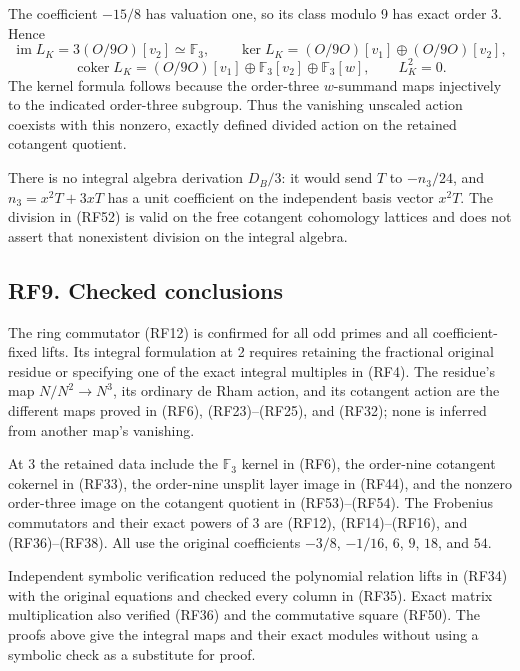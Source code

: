 \documentclass[
]{article}
\begin{document}
The coefficient \(-15/8\) has valuation one, so its class modulo 9 has
exact order 3. Hence \[
\operatorname{im}L_K=3(O/9O)[v_2]\simeq\mathbb F_3,\qquad
\ker L_K=(O/9O)[v_1]\oplus(O/9O)[v_2],
\] \[
\operatorname{coker}L_K
=(O/9O)[v_1]\oplus\mathbb F_3[v_2]\oplus\mathbb F_3[w],
\qquad L_K^2=0.
\tag{RF54}
\] The kernel formula follows because the order-three \(w\)-summand maps
injectively to the indicated order-three subgroup. Thus the vanishing
unscaled action coexists with this nonzero, exactly defined divided
action on the retained cotangent quotient.

There is no integral algebra derivation \(D_B/3\): it would send \(T\)
to \(-n_3/24\), and \(n_3=x^2T+3xT\) has a unit coefficient on the
independent basis vector \(x^2T\). The division in (RF52) is valid on
the free cotangent cohomology lattices and does not assert that
nonexistent division on the integral algebra.

\subsection{RF9. Checked conclusions}\label{rf9.-checked-conclusions}

The ring commutator (RF12) is confirmed for all odd primes and all
coefficient-fixed lifts. Its integral formulation at 2 requires
retaining the fractional original residue or specifying one of the exact
integral multiples in (RF4). The residue's map \(N/N^2\to N^3\), its
ordinary de Rham action, and its cotangent action are the different maps
proved in (RF6), (RF23)--(RF25), and (RF32); none is inferred from
another map's vanishing.

At 3 the retained data include the \(\mathbb F_3\) kernel in (RF6), the
order-nine cotangent cokernel in (RF33), the order-nine unsplit layer
image in (RF44), and the nonzero order-three image on the cotangent
quotient in (RF53)--(RF54). The Frobenius commutators and their exact
powers of 3 are (RF12), (RF14)--(RF16), and (RF36)--(RF38). All use the
original coefficients \(-3/8\), \(-1/16\), \(6\), \(9\), \(18\), and
\(54\).

Independent symbolic verification reduced the polynomial relation lifts
in (RF34) with the original equations and checked every column in
(RF35). Exact matrix multiplication also verified (RF36) and the
commutative square (RF50). The proofs above give the integral maps and
their exact modules without using a symbolic check as a substitute for
proof.
\end{document}
